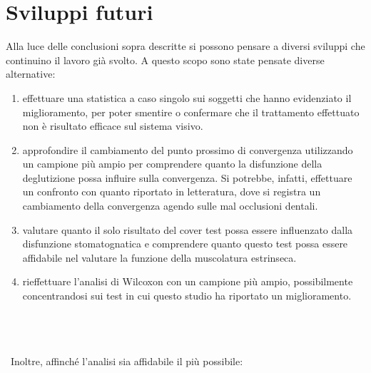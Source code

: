 \section{Sviluppi futuri}

Alla luce delle conclusioni sopra descritte si possono pensare a diversi sviluppi che continuino il lavoro già svolto. A questo scopo sono state pensate diverse alternative:
\begin{enumerate}
\item effettuare una statistica a caso singolo sui soggetti che hanno evidenziato il miglioramento, per poter smentire o confermare che il trattamento effettuato non è risultato efficace sul sistema visivo.
\item approfondire il cambiamento del punto prossimo di convergenza utilizzando un campione più ampio per comprendere quanto la disfunzione della deglutizione possa influire sulla convergenza. Si potrebbe, infatti, effettuare un confronto con quanto riportato in letteratura, dove si registra un cambiamento della convergenza agendo sulle mal occlusioni dentali.
\item valutare quanto il solo risultato del cover test possa essere influenzato dalla disfunzione stomatognatica e comprendere quanto questo test possa essere affidabile nel valutare la funzione della muscolatura estrinseca.
\item rieffettuare l’analisi di Wilcoxon con un campione più ampio, possibilmente concentrandosi sui test in cui questo studio ha riportato un miglioramento.
\end{enumerate}
\\\ \\\ \\\
Inoltre, affinché l’analisi sia affidabile il più possibile:
